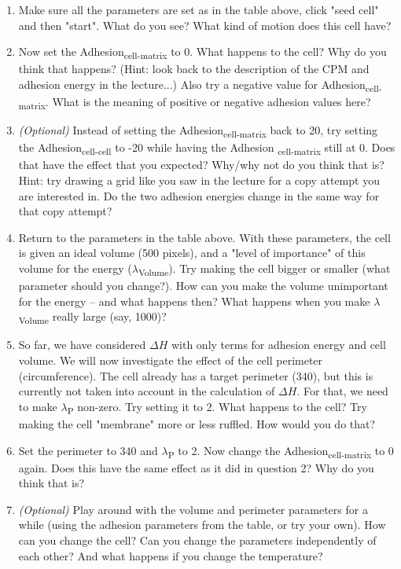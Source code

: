 \documentclass{article}
\begin{document}
\begin{enumerate}
	\item Make sure all the parameters are set as in the table above, click "seed cell" and then "start". What do you see? What kind of motion does this cell have?
	\item Now set the Adhesion\textsubscript{cell-matrix} to 0. What happens to the cell? Why do you think that happens? (Hint: look back to the description of the CPM and adhesion energy in the lecture...) Also try a negative value for Adhesion\textsubscript{cell-matrix}. What is the meaning of positive or negative adhesion values here?
	\item \textit{(Optional)} Instead of setting the Adhesion\textsubscript{cell-matrix} back to 20, try setting the Adhesion\textsubscript{cell-cell} to -20 while having the Adhesion \textsubscript{cell-matrix} still at 0. Does that have the effect that you expected? Why/why not do you think that is? Hint: try drawing a grid like you saw in the lecture for a copy attempt you are interested in. Do the two adhesion energies change in the same way for that copy attempt?
	\item Return to the parameters in the table above. With these parameters, the cell is given an ideal volume (500 pixels), and a "level of importance" of this volume for the energy ($\lambda$\textsubscript{Volume}). Try making the cell bigger or smaller (what parameter should you change?). How can you make the volume unimportant for the energy -- and what happens then? What happens when you make $\lambda$\textsubscript{Volume} really large (say, 1000)?
	\item So far, we have considered $\Delta H$ with only terms for adhesion energy and cell volume. We will now investigate the effect of the cell perimeter (circumference). The cell already has a target perimeter (340), but this is currently not taken into account in the calculation of $\Delta H$. For that, we need to make $\lambda$\textsubscript{P} non-zero. Try setting it to 2. What happens to the cell? Try making the cell "membrane" more or less ruffled. How would you do that?
\item Set the perimeter to 340 and $\lambda$\textsubscript{P} to 2. Now change the Adhesion\textsubscript{cell-matrix} to 0 again. Does this have the same effect as it did in question 2? Why do you think that is?
\item \textit{(Optional)} Play around with the volume and perimeter parameters for a while (using the adhesion parameters from the table, or try your own). How can you change the cell? Can you change the parameters independently of each other? And what happens if you change the temperature?
\end{enumerate} 
\end{document}

